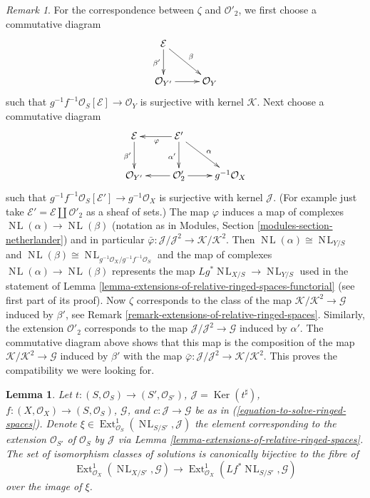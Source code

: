 \documentclass{stacks-project}
\theoremstyle{plain}
\newtheorem{lemma}[subsection]{Lemma}
\theoremstyle{definition}
\theoremstyle{remark}
\newtheorem{remark}[subsection]{Remark}
\numberwithin{equation}{subsection}
\def\Ext{\mathop{\mathrm{Ext}}\nolimits}
\def\NL{\mathop{N\!L}\nolimits}
\def\Ker{\mathop{\mathrm{Ker}}}
\begin{document}
\begin{remark}
For the correspondence between $\zeta$ and $\mathcal{O}'_2$,
we first choose a commutative diagram
$$
\xymatrix{
\mathcal{E} \ar[d]_{\beta'} \ar[rd]^\beta \\
\mathcal{O}_{Y'} \ar[r] & \mathcal{O}_Y
}
$$
such that $g^{-1}f^{-1}\mathcal{O}_S[\mathcal{E}] \to \mathcal{O}_Y$
is surjective with kernel $\mathcal{K}$. Next choose a
commutative diagram
$$
\xymatrix{
\mathcal{E} \ar[d]_{\beta'} &
\mathcal{E}' \ar[l]^\varphi \ar[d]_{\alpha'} \ar[rd]^\alpha \\
\mathcal{O}_{Y'} &
\mathcal{O}'_2 \ar[l] \ar[r] &
g^{-1}\mathcal{O}_X
}
$$
such that $g^{-1}f^{-1}\mathcal{O}_S[\mathcal{E}'] \to g^{-1}\mathcal{O}_X$
is surjective with kernel $\mathcal{J}$. (For example just take
$\mathcal{E}' = \mathcal{E} \amalg \mathcal{O}'_2$ as a sheaf of sets.)
The map $\varphi$ induces a map of complexes $\NL(\alpha) \to \NL(\beta)$
(notation as in Modules, Section \ref{modules-section-netherlander})
and in particular
$\bar\varphi : \mathcal{J}/\mathcal{J}^2 \to \mathcal{K}/\mathcal{K}^2$.
Then $\NL(\alpha) \cong \NL_{Y/S}$ and
$\NL(\beta) \cong \NL_{g^{-1}\mathcal{O}_X/g^{-1}f^{-1}\mathcal{O}_S}$
and the map of complexes $\NL(\alpha) \to \NL(\beta)$
represents the map $Lg^*\NL_{X/S} \to \NL_{Y/S}$ used in the
statement of Lemma \ref{lemma-extensions-of-relative-ringed-spaces-functorial}
(see first part of its proof). Now $\zeta$ corresponds to the
class of the map $\mathcal{K}/\mathcal{K}^2 \to \mathcal{G}$
induced by $\beta'$, see
Remark \ref{remark-extensions-of-relative-ringed-spaces}.
Similarly, the extension $\mathcal{O}'_2$ corresponds to the map
$\mathcal{J}/\mathcal{J}^2 \to \mathcal{G}$ induced by $\alpha'$.
The commutative diagram above shows that this map is
the composition of the map $\mathcal{K}/\mathcal{K}^2 \to \mathcal{G}$
induced by $\beta'$ with the map
$\bar\varphi : \mathcal{J}/\mathcal{J}^2 \to \mathcal{K}/\mathcal{K}^2$.
This proves the compatibility we were looking for.
\end{remark}

\begin{lemma}
\label{lemma-parametrize-solutions-ringed-spaces}
Let $t : (S, \mathcal{O}_S) \to (S', \mathcal{O}_{S'})$,
$\mathcal{J} = \Ker(t^\sharp)$,
$f : (X, \mathcal{O}_X) \to (S, \mathcal{O}_S)$, $\mathcal{G}$, and
$c : \mathcal{J} \to \mathcal{G}$ be as in
(\ref{equation-to-solve-ringed-spaces}).
Denote $\xi \in \Ext^1_{\mathcal{O}_S}(\NL_{S/S'}, \mathcal{J})$
the element corresponding to the extension $\mathcal{O}_{S'}$
of $\mathcal{O}_S$ by $\mathcal{J}$ via
Lemma \ref{lemma-extensions-of-relative-ringed-spaces}.
The set of isomorphism classes of solutions is canonically bijective
to the fibre of
$$
\Ext^1_{\mathcal{O}_X}(\NL_{X/S'}, \mathcal{G}) \to
\Ext^1_{\mathcal{O}_X}(Lf^*\NL_{S/S'}, \mathcal{G})
$$
over the image of $\xi$.
\end{lemma}
\end{document}

